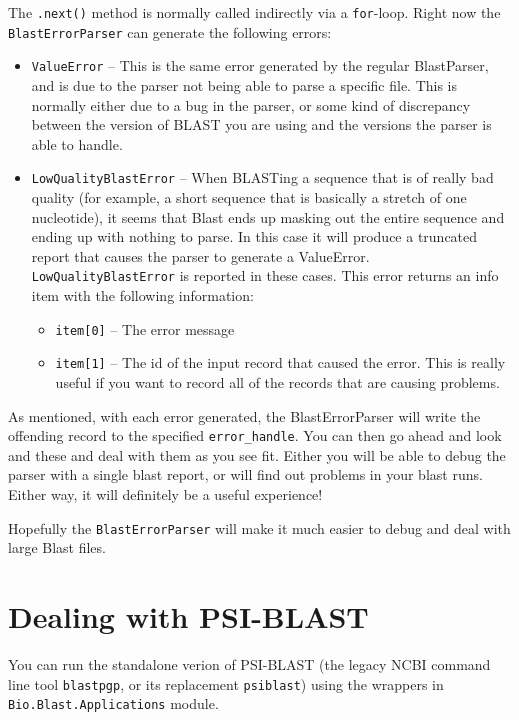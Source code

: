 \documentclass{report}
\begin{document}
The \verb|.next()| method is normally called indirectly via a \verb|for|-loop.
Right now the \verb|BlastErrorParser| can generate the following errors:

\begin{itemize}
  \item \verb|ValueError| -- This is the same error generated by the regular BlastParser, and is due to the parser not being able to parse a specific file. This is normally either due to a bug in the parser, or some kind of discrepancy between the version of BLAST you are using and the versions the parser is able to handle.

  \item \verb|LowQualityBlastError| -- When BLASTing a sequence that is of really bad quality (for example, a short sequence that is basically a stretch of one nucleotide), it seems that Blast ends up masking out the entire sequence and ending up with nothing to parse. In this case it will produce a truncated report that causes the parser to generate a ValueError. \verb|LowQualityBlastError| is reported in these cases. This error returns an info item with the following information:
  \begin{itemize}
    \item \verb|item[0]| -- The error message
    \item \verb|item[1]| -- The id of the input record that caused the error. This is really useful if you want to record all of the records that are causing problems.
  \end{itemize}
\end{itemize}

As mentioned, with each error generated, the BlastErrorParser will write the offending record to the specified \verb|error_handle|. You can then go ahead and look and these and deal with them as you see fit. Either you will be able to debug the parser with a single blast report, or will find out problems in your blast runs. Either way, it will definitely be a useful experience!

Hopefully the \verb|BlastErrorParser| will make it much easier to debug and deal with large Blast files.

\section{Dealing with PSI-BLAST}

You can run the standalone verion of PSI-BLAST (the legacy NCBI command line
tool \verb|blastpgp|, or its replacement \verb|psiblast|) using the wrappers
in \verb|Bio.Blast.Applications| module.
\end{document}
